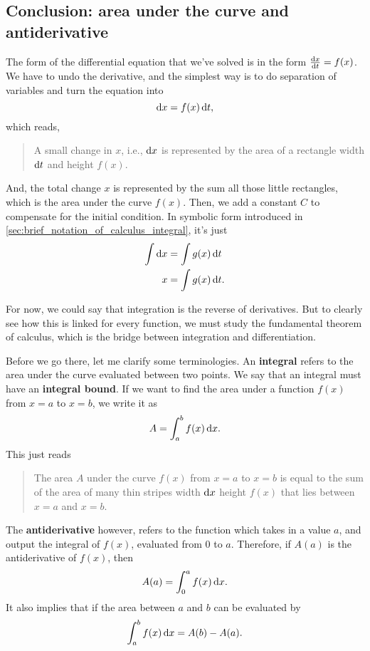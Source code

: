 \subsection{Conclusion: area under the curve and antiderivative}

The form of the differential equation that we've solved is in the form $\odv{x}{t} = f(x)$. We have to undo the derivative, and the simplest way is to do separation of variables and turn the equation into
\begin{equation}
    \odif{x} = f(x)\odif{t},
\end{equation}
which reads,
\begin{quotation}
    A small change in $x$, i.e., $\odif{x}$ is represented by the area of a rectangle width $\odif{t}$ and height $f(x)$.
\end{quotation}
And, the total change $x$ is represented by the sum all those little rectangles, which is the area under the curve $f(x)$. Then, we add a constant $C$ to compensate for the initial condition. In symbolic form introduced in \cref{sec:brief_notation_of_calculus_integral}, it's just
\begin{align}
    \int\odif{x} &= \int g(x)\odif{t} \\
    x &= \int g(x)\odif{t}.
\end{align}

For now, we could say that integration is the reverse of derivatives. But to clearly see how this is linked for every function, we must study the fundamental theorem of calculus, which is the bridge between integration and differentiation.

Before we go there, let me clarify some terminologies. An \textbf{integral} refers to the area under the curve evaluated between two points. We say that an integral must have an \textbf{integral bound}. If we want to find the area under a function $f(x)$ from $x = a$ to $x = b$, we write it as
\begin{equation}
    A = \int_a^b f(x)\odif{x}.
\end{equation}
This just reads
\begin{quotation}
    The area $A$ under the curve $f(x)$ from $x = a$ to $x = b$ is equal to the sum of the area of many thin stripes width $\odif{x}$ height $f(x)$ that lies between $x = a$ and $x = b$.
\end{quotation}
The \textbf{antiderivative} however, refers to the function which takes in a value $a$, and output the integral of $f(x)$, evaluated from $0$ to $a$. Therefore, if $A(a)$ is the antiderivative of $f(x)$, then
\begin{equation}
    A(a) = \int_0^a f(x)\odif{x}.
\end{equation}
It also implies that if the area between $a$ and $b$ can be evaluated by
\begin{equation}
    \int_a^b f(x)\odif{x} = A(b) - A(a).
\end{equation}

